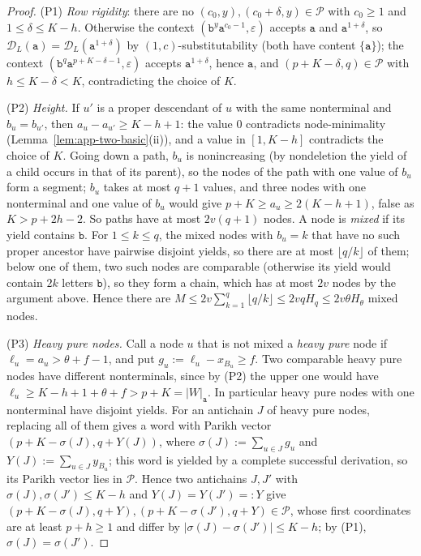 \documentclass[11pt]{article}
\numberwithin{equation}{section}
\theoremstyle{plain}
\theoremstyle{definition}
\theoremstyle{remark}
\newcommand{\D}{\mathcal{D}}
\newcommand{\eps}{\varepsilon}
\theoremstyle{plain}
\begin{document}
\begin{proof}
(P1) \emph{Row rigidity}: there are no $(c_0,y),(c_0+\delta,y)\in\mathcal P$ with
$c_0\ge1$ and $1\le\delta\le K-h$.  Otherwise the context
$(\mathtt b^y\mathtt a^{c_0-1},\eps)$ accepts $\mathtt a$ and $\mathtt a^{1+\delta}$, so
$\D_L(\mathtt a)=\D_L(\mathtt a^{1+\delta})$ by $(1,c)$-substitutability (both have
content $\{\mathtt a\}$); the context $(\mathtt b^q\mathtt a^{p+K-\delta-1},\eps)$ accepts
$\mathtt a^{1+\delta}$, hence $\mathtt a$, and $(p+K-\delta,q)\in\mathcal P$ with
$h\le K-\delta<K$, contradicting the choice of $K$.

(P2) \emph{Height.}  If $u'$ is a proper descendant of $u$ with the same
nonterminal and $b_u=b_{u'}$, then $a_u-a_{u'}\ge K-h+1$: the value $0$
contradicts node-minimality (Lemma~\ref{lem:app-two-basic}(ii)), and a value in
$[1,K-h]$ contradicts the choice of $K$.  Going down a path, $b_u$ is
nonincreasing (by nondeletion the yield of a child occurs in that of its parent),
so the nodes of the path with one value of $b_u$ form a segment; $b_u$ takes at most $q+1$
values, and three nodes with one nonterminal and one value of $b_u$ would give
$p+K\ge a_u\ge2(K-h+1)$, false as $K>p+2h-2$.  So paths have at most $2v(q+1)$
nodes.  A node is \emph{mixed} if its yield contains $\mathtt b$.  For
$1\le k\le q$, the mixed nodes with $b_u=k$ that have no such proper ancestor have
pairwise disjoint yields, so there are at most $\lfloor q/k\rfloor$ of them; below
one of them, two such nodes are comparable (otherwise its yield would contain $2k$
letters $\mathtt b$), so they form a chain, which has at most $2v$ nodes by the
argument above.  Hence there are
$M\le2v\sum_{k=1}^q\lfloor q/k\rfloor\le2vqH_q\le2v\theta H_\theta$ mixed nodes.

(P3) \emph{Heavy pure nodes.}  Call a node $u$ that is not mixed a
\emph{heavy pure} node if $\ell_u=a_u>\theta+f-1$, and put
$g_u:=\ell_u-x_{B_u}\ge f$.  Two comparable heavy pure nodes have different
nonterminals, since by (P2) the upper one would have
$\ell_u\ge K-h+1+\theta+f>p+K=|W|_{\mathtt a}$.  In particular heavy pure nodes with
one nonterminal have disjoint yields.  For an antichain $J$ of heavy pure nodes,
replacing all of them gives a word with Parikh vector $(p+K-\sigma(J),q+Y(J))$,
where $\sigma(J):=\sum_{u\in J}g_u$ and $Y(J):=\sum_{u\in J}y_{B_u}$; this word is yielded by a complete successful derivation, so its Parikh vector
lies in $\mathcal P$.  Hence two antichains $J,J'$ with
$\sigma(J),\sigma(J')\le K-h$ and $Y(J)=Y(J')=:Y$ give
$(p+K-\sigma(J),q+Y),(p+K-\sigma(J'),q+Y)\in\mathcal P$, whose first coordinates
are at least $p+h\ge1$ and differ by $|\sigma(J)-\sigma(J')|\le K-h$; by (P1),
$\sigma(J)=\sigma(J')$.


\end{proof}
\end{document}
